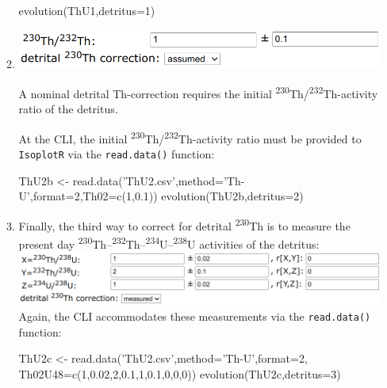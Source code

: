 \begin{refsection}
\begin{enumerate}
\begin{enumerate}
\begin{console}
evolution(ThU1,detritus=1)
\end{console}

  \item \begin{minipage}[t]{.7\linewidth}
    \strut\vspace*{-\baselineskip}\newline
    \includegraphics[width=\linewidth]{../figures/ThUinitialThassumed.png}
  \end{minipage}
    \begin{minipage}[t]{.3\linewidth}
      A nominal detrital Th-correction requires the initial
      \textsuperscript{230}Th/\textsuperscript{232}Th-activity ratio
      of the detritus.\\
    \end{minipage}

    At the CLI, the initial
    \textsuperscript{230}Th/\textsuperscript{232}Th-activity ratio
    must be provided to \texttt{IsoplotR} via the \texttt{read.data()}
    function:

\begin{script}
ThU2b <- read.data('ThU2.csv',method='Th-U',format=2,Th02=c(1,0.1))
evolution(ThU2b,detritus=2)
\end{script}

\item Finally, the third way to correct for detrital
  \textsuperscript{230}Th is to measure the present day
  \textsuperscript{230}Th--\textsuperscript{232}Th--\textsuperscript{234}U--\textsuperscript{238}U
  activities of the detritus:\\

  \noindent\includegraphics[width=\linewidth]{../figures/ThUmeasureddetritus.png}\\

 Again, the CLI accommodates these measurements via the
 \texttt{read.data()} function:

\begin{script}
ThU2c <- read.data('ThU2.csv',method='Th-U',format=2,
                   Th02U48=c(1,0.02,2,0.1,1,0.1,0,0,0))
evolution(ThU2c,detritus=3)
\end{script}


\end{enumerate}
\end{enumerate}
\end{refsection}
